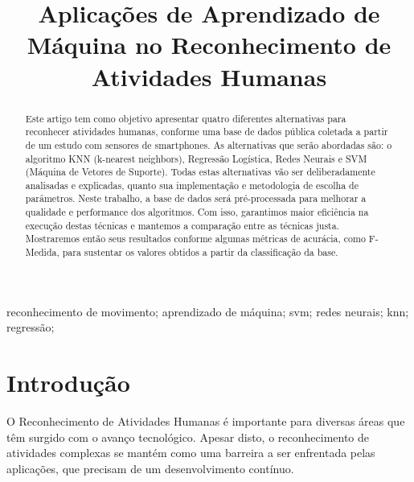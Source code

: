 \documentclass[10pt, conference, compsocconf]{IEEEtran}
\begin{document}
\title{Aplicações de Aprendizado de Máquina no Reconhecimento de Atividades
Humanas}


\author{
}

\maketitle


\begin{abstract}
Este artigo tem como objetivo apresentar quatro diferentes alternativas para reconhecer  atividades humanas, conforme uma base de dados pública coletada a partir de um estudo com sensores de smartphones. As alternativas que serão abordadas são: o algoritmo KNN (k-nearest neighbors), Regressão Logística, Redes Neurais e SVM (Máquina de Vetores de Suporte). Todas estas alternativas vão ser deliberadamente analisadas e explicadas, quanto sua implementação e metodologia de escolha de parâmetros.
    Neste trabalho, a base de dados será pré-processada para melhorar a qualidade e performance dos algoritmos. Com isso, garantimos maior eficiência na execução destas técnicas e mantemos a comparação entre as técnicas justa. Mostraremos então seus resultados conforme algumas métricas de acurácia, como F-Medida, para sustentar os valores obtidos a partir da classificação da base.


\end{abstract}

\begin{IEEEkeywords}
 reconhecimento de movimento; aprendizado de máquina; svm; redes neurais; knn;
regressão;
\end{IEEEkeywords}

\IEEEpeerreviewmaketitle



\section{Introdução}
O Reconhecimento de Atividades Humanas é importante para diversas áreas que têm surgido com o avanço tecnológico. Apesar disto, o reconhecimento de atividades complexas se mantém como uma barreira a ser enfrentada pelas aplicações, que precisam de um desenvolvimento contínuo.
\end{document}
